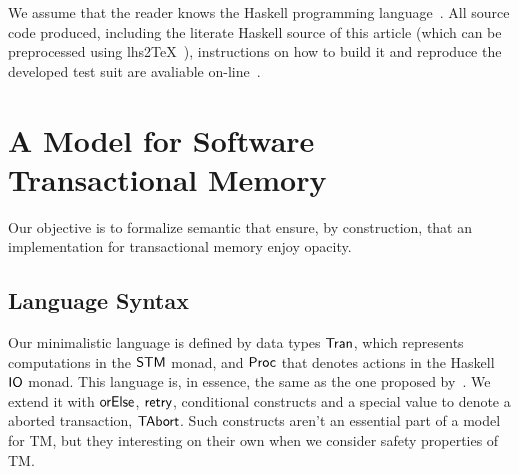 \documentclass[sigplan]{acmart}
\theoremstyle{definition}
\newcommand{\D}[1]{\blue{\mathsf{#1}}}
\newcommand{\C}[1]{\red{\mathsf{#1}}}
\newcommand{\F}[1]{\green{\mathsf{#1}}}
\begin{document}
We assume that the reader knows the Haskell programming language~\cite{Lipovaca2011}.
All source code produced, including the literate Haskell source of this article
(which can be preprocessed using lhs2\TeX~\cite{Loh2005}), instructions on how to
build it and reproduce the developed test suit are avaliable on-line~\cite{stm-rep}.




\section{A Model for Software Transactional Memory}\label{sec:stm-model}

Our objective is to formalize semantic that ensure, by construction, that an
implementation for transactional memory enjoy opacity. 

\subsection{Language Syntax}\label{sec:stm-syntax}

Our minimalistic language is defined by data types \ensuremath{\D{Tran}}, which
represents computations in the \ensuremath{\D{STM}} monad, and \ensuremath{\D{Proc}} that denotes
actions in the Haskell \ensuremath{\D{IO}} monad. This language is, in essence,
the same as the one proposed by~\cite{Hu08}. We extend it with
\ensuremath{\F{orElse}}, \ensuremath{\F{retry}}, conditional constructs and a special value to
denote a aborted transaction, \ensuremath{\C{TAbort}}. Such constructs aren't
an essential part of a model for TM, but they interesting
on their own when we consider safety properties of TM.
\end{document}
